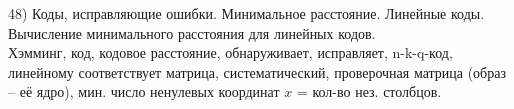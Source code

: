 48) Коды, исправляющие ошибки. Минимальное расстояние. Линейные коды. Вычисление минимального расстояния для линейных кодов.\\
Хэмминг, код, кодовое расстояние, обнаруживает, исправляет, n-k-q-код, линейному соответствует матрица, систематический, проверочная матрица (образ -- её ядро), мин. число ненулевых координат $x$ = кол-во нез. столбцов.\\
